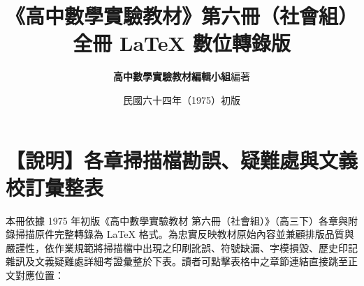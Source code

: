\documentclass[a4paper,12pt,twoside]{article}
\title{\LARGE\textbf{《高中數學實驗教材》第六冊（社會組）}\\[0.5em] \Large\textbf{全冊 \LaTeX{} 數位轉錄版}}
\author{\textbf{高中數學實驗教材編輯小組}\quad 編著}
\date{民國六十四年（1975）初版}
\begin{document}
\maketitle
\thispagestyle{empty}

\section*{【說明】各章掃描檔勘誤、疑難處與文義校訂彙整表}
\label{sec:master_errata_notes_b6s}
\label{sec:current_errata}

本冊依據 1975 年初版《高中數學實驗教材 第六冊（社會組）》（高三下）各章與附錄掃描原件完整轉錄為 \LaTeX{} 格式。為忠實反映教材原始內容並兼顧排版品質與嚴謹性，依作業規範將掃描檔中出現之印刷訛誤、符號缺漏、字模損毀、歷史印記雜訊及文義疑難處詳細考證彙整於下表。讀者可點擊表格中之章節連結直接跳至正文對應位置：
\end{document}
